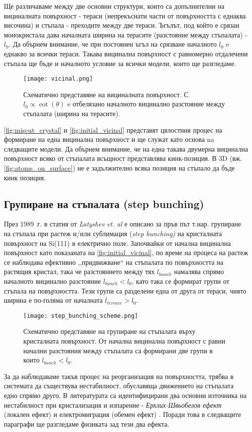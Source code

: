Ще различаваме между две основни структури, които са допълнителни на вициналната повърхност - тераси (непрекъснати части от повърхността с еднаква височина) и стъпала - преходите между две тераси. Ъгълът, под който е срязан монокристала дава началната ширина на терасите (разстояние между стъпалата) - $l_0$. Да обърнем внимание, че при постоянен ъгъл на срязване началното $l_0$ e еднакво за всички тераси. Такава вицинална повърхност с равномерно отдалечени стъпала ще бъде и началното условие за всички модели, които ще разгледаме.
\begin{figure}[htbp]
	\centering
	\texttt{[image: vicinal.png]}
	\caption{Схематично представяне на вициналната повърхност. С $l_0  \propto \cot{\left( \theta \right)} $ e отбелязано началното вицинално разстояние между стъпалата (ширина на терасите).}
	\label{fig:initial_vicinal}
\end{figure}

\autoref{fig:miscut_crystal} и \autoref{fig:initial_vicinal} представят цялостния процес на формиране на една вицинална повърхност и ще служат като основа na следващите модели. Да обърнем внимание, че на една такава двумерна вицинална повърхност всяко от стъпалата всъщност представлява кинк-позиция. В 3D (вж. \autoref{fig:atoms_on_surface}) не е задължително всяка позиция на стъпало да бъде кинк позиция.
\subsection{Групиране на стъпалата (step bunching)}
През 1989~г. в статия от \textit{Latyshev et. al} \cite{Latyshev1989} е описано за пръв път т.нар. групиране на стъпала при растеж и/или сублимация (\textit{step bunching)} на кристалната повърхност на Si(111) в електрично поле. Започвайки от начална вицинална повърхност като показаната на \autoref{fig:initial_vicinal}, по време на процеса на растеж се наблюдава ефективно ,,придвижване`` на стъпалата по повърхността на растящия кристал, така че разстоянието между тях $l_{bunch}$ намалява спрямо началното вицинално разстояние $l_{bunch} < l_0$, като така се формират групи от стъпала на повърхността. Тези групи са разделени една от друга от тераси, чиято ширина е по-голяма от началната $l_{terrace}  > l_0$.
\begin{figure}[htbp]
	\centering
	\texttt{[image: step\_bunching\_scheme.png]}
	\caption{Схематично представяне на групиране на стъпалата върху кристалната повърхност. От начална вицинална повърхност с равни начални разстояния между стъпалата са формирани две групи в които $l_{bunch} < l_0$.}
	\label{fig:step_bunching}
\end{figure}
За да наблюдаваме такъв процес на реорганизация на повърхността, трябва в системата да съществува нестабилност, обуславяща движението на стъпалата едно спрямо друго. В литературата \cite{StoyanStoyanov1991}\cite{TonchevArxiv2012} са идентифицирани два основни източника на нестабилност при кристализация и изпарение - \textit{Ерхлих-Швьобелов ефект} (локален ефект) \cite{Ehrlich1966} \cite{Schwoebel1966} и електромиграция (обемен ефект) \cite{Latyshev1989}. Поради това в следващите параграфи ще разгледаме физиката зад тези два ефекта.

